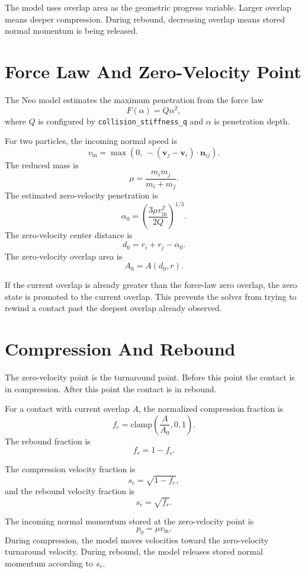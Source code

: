 \documentclass[11pt]{article}
\begin{document}
The model uses overlap area as the geometric progress variable. Larger overlap
means deeper compression. During rebound, decreasing overlap means stored
normal momentum is being released.

\section{Force Law And Zero-Velocity Point}

The Neo model estimates the maximum penetration from the force law
\[
    F(\alpha) = Q\alpha^2,
\]
where \(Q\) is configured by \texttt{collision\_stiffness\_q} and
\(\alpha\) is penetration depth.

For two particles, the incoming normal speed is
\[
    v_{\mathrm{in}}
    =
    \max\left(0,\,
    -(\mathbf{v}_j - \mathbf{v}_i)\cdot \mathbf{n}_{ij}
    \right).
\]
The reduced mass is
\[
    \mu = \frac{m_i m_j}{m_i + m_j}.
\]
The estimated zero-velocity penetration is
\[
    \alpha_0
    =
    \left(
        \frac{3\mu v_{\mathrm{in}}^2}{2Q}
    \right)^{1/3}.
\]
The zero-velocity center distance is
\[
    d_0 = r_i + r_j - \alpha_0.
\]
The zero-velocity overlap area is
\[
    A_0 = A(d_0, r).
\]

If the current overlap is already greater than the force-law zero overlap,
the zero state is promoted to the current overlap. This prevents the solver
from trying to rewind a contact past the deepest overlap already observed.

\section{Compression And Rebound}

The zero-velocity point is the turnaround point. Before this point the contact
is in compression. After this point the contact is in rebound.

For a contact with current overlap \(A\), the normalized compression fraction is
\[
    f_c = \mathrm{clamp}\left(\frac{A}{A_0}, 0, 1\right).
\]
The rebound fraction is
\[
    f_r = 1 - f_c.
\]

The compression velocity fraction is
\[
    s_c = \sqrt{1 - f_c},
\]
and the rebound velocity fraction is
\[
    s_r = \sqrt{f_r}.
\]

The incoming normal momentum stored at the zero-velocity point is
\[
    p_0 = \mu v_{\mathrm{in}}.
\]
During compression, the model moves velocities toward the zero-velocity
turnaround velocity. During rebound, the model releases stored normal momentum
according to \(s_r\).
\end{document}
